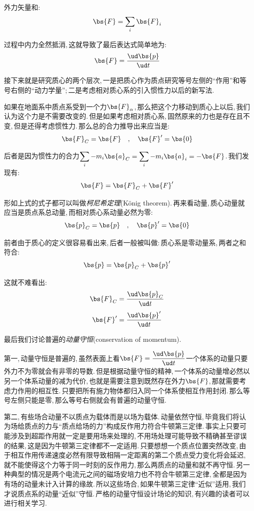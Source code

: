 外力矢量和:
\[\bs{F}=\sum_i \bs{F}_i\]

过程中内力全然抵消,\,这就导致了最后表达式简单地为:
\[\bs{F}=\frac{\ud \bs{p}}{\ud t}\]

\vspace{0.5cm}

接下来就是研究质心的两个层次,\,一是把质心作为质点研究等号左侧的``作用''和等号右侧的``动力学量'';\,二是考虑相对质心系的引入惯性力以后的新写法.

如果在地面系中质点系受到一个力$\bs{F}_\alpha$,\,那么把这个力移动到质心上以后,\,我们认为这个力是不需要改变的.\,但是如果考虑相对质心系,\,固然原来的力也是存在且不变,\,但是还得考虑惯性力.\,那么总的合力推导出来应当是:
\[\bs{F}_C=\bs{F}\quad ,\quad \bs{F}'=\bs{0}\]

后者是因为惯性力的合力$\displaystyle\sum_i -m_i\bs{a}_C=\sum_i -m_i\bs{a}_i=-\bs{F}$.\,我们发现有:
\[\bs{F}=\bs{F}_C+\bs{F}'\]

形如上式的式子都可以叫做\emph{柯尼希定理}(K\"onig theorem).\,再来看动量,\,质心动量就应当是质点系总动量,\,而相对质心系动量必然为零:
\[\bs{p}_C=\bs{p}\quad,\quad \bs{p}'=\bs{0}\]

前者由于质心的定义很容易看出来,\,后者一般被叫做:\,质心系是零动量系,\,两者之和符合:
\[\bs{p}=\bs{p}_C+\bs{p}'\]

这就不难看出:
\[\bs{F}_C=\frac{\ud \bs{p}_C}{\ud t}\]
\[\bs{F}'=\frac{\ud \bs{p}'}{\ud t}\]

最后我们讨论普遍的\emph{动量守恒}(conservation of momentum).

第一,\,动量守恒是普遍的,\,虽然表面上看$\bs{F}=\dfrac{\ud\bs{p}}{\ud t}$一个体系的动量只要外力不为零就会有非零的导数.\,但是根据动量守恒的精神,\,一个体系的动量增必然以另一个体系动量的减为代价,\,也就是需要注意到既然存在外力$\bs{F}$,\,那就需要考虑力作用的相互性.\,只要把所有施力物体都归入同一个体系使相互作用封闭.\,那么等号左侧只能是零,\,那么等号右侧就会有普遍的动量守恒.

第二,\,有些场合动量不以质点为载体而是以场为载体.\,动量依然守恒,\,毕竟我们将认为场给质点的力与``质点给场的力''构成反作用力符合牛顿第三定律.\,事实上只要可能涉及到超距作用就一定是要用场来处理的,\,不用场处理可能导致不精确甚至谬误的结果,\,这是因为牛顿第三定律都不一定适用.\,只要想想一个质点位置突然改变,\,由于相互作用传递速度必然有限导致相隔一定距离的第二个质点受力变化将会延迟,\,就不能使得这个力等于同一时刻的反作用力,\,那么两质点的动量和就不再守恒.\,另一种典型的情况是两个电流元之间的磁场安培力也不符合牛顿第三定律,\,全都是因为有场的动量未计入计算的缘故.\,所以这些场合,\,如果牛顿第三定律``近似''适用,\,我们才说质点系的动量``近似''守恒.\,严格的动量守恒设计场论的知识,\,有兴趣的读者可以进行相关学习.


